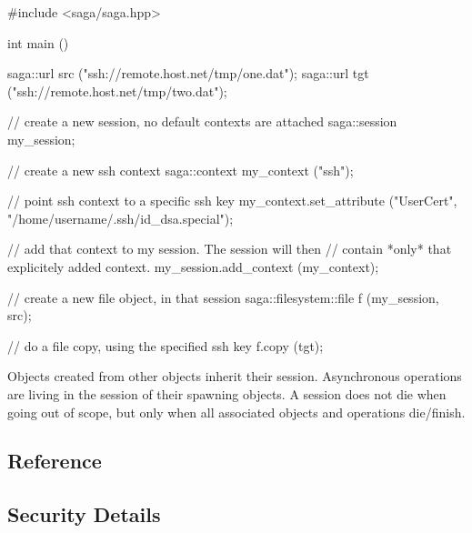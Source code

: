   \begin{mycode}[label=Secure gsiftp file copy]
  #include <saga/saga.hpp>

  int main ()
  {
    saga::url src ("ssh://remote.host.net/tmp/one.dat");
    saga::url tgt ("ssh://remote.host.net/tmp/two.dat");

    // create a new session, no default contexts are attached
    saga::session my_session;

    // create a new ssh context
    saga::context my_context ("ssh");

    // point ssh context to a specific ssh key
    my_context.set_attribute ("UserCert", 
                              "/home/username/.ssh/id_dsa.special");

    // add that context to my session.  The session will then 
    // contain *only* that explicitely added context.
    my_session.add_context (my_context);

    // create a new file object, in that session
    saga::filesystem::file f (my_session, src);

    // do a file copy, using the specified ssh key
    f.copy (tgt);
  }
  \end{mycode}


  Objects created from other objects inherit their session.
  Asynchronous operations are living in the session of their spawning
  objects.  A session does not die when going out of scope, but only
  when all associated objects and operations die/finish.


 \subsection{Reference}


 \subsection{Security Details}




